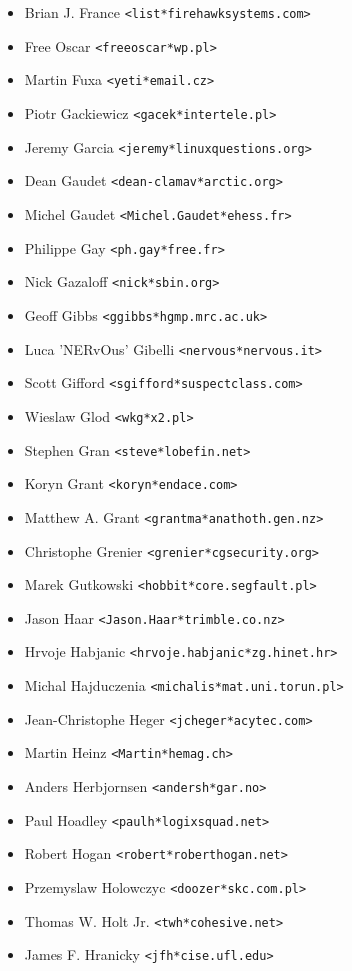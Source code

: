 \documentclass[a4paper,titlepage,12pt]{article}
\newcommand{\email}[1]{\texttt{#1}}
\begin{document}
\begin{itemize}
	\item Brian J. France \email{<list*firehawksystems.com>}
	\item Free Oscar \email{<freeoscar*wp.pl>}
	\item Martin Fuxa \email{<yeti*email.cz>}
	\item Piotr Gackiewicz \email{<gacek*intertele.pl>}
	\item Jeremy Garcia \email{<jeremy*linuxquestions.org>}
	\item Dean Gaudet \email{<dean-clamav*arctic.org>}
	\item Michel Gaudet \email{<Michel.Gaudet*ehess.fr>}
	\item Philippe Gay \email{<ph.gay*free.fr>}
	\item Nick Gazaloff \email{<nick*sbin.org>}
	\item Geoff Gibbs \email{<ggibbs*hgmp.mrc.ac.uk>}
	\item Luca 'NERvOus' Gibelli \email{<nervous*nervous.it>}
	\item Scott Gifford \email{<sgifford*suspectclass.com>}
	\item Wieslaw Glod \email{<wkg*x2.pl>}
	\item Stephen Gran \email{<steve*lobefin.net>}
	\item Koryn Grant \email{<koryn*endace.com>}
	\item Matthew A. Grant \email{<grantma*anathoth.gen.nz>}
	\item Christophe Grenier \email{<grenier*cgsecurity.org>}
	\item Marek Gutkowski \email{<hobbit*core.segfault.pl>}
	\item Jason Haar \email{<Jason.Haar*trimble.co.nz>}
	\item Hrvoje Habjanic \email{<hrvoje.habjanic*zg.hinet.hr>}
	\item Michal Hajduczenia \email{<michalis*mat.uni.torun.pl>}
	\item Jean-Christophe Heger \email{<jcheger*acytec.com>}
	\item Martin Heinz \email{<Martin*hemag.ch>}
	\item Anders Herbjornsen \email{<andersh*gar.no>}
	\item Paul Hoadley \email{<paulh*logixsquad.net>}
	\item Robert Hogan \email{<robert*roberthogan.net>}
	\item Przemyslaw Holowczyc \email{<doozer*skc.com.pl>}
	\item Thomas W. Holt Jr. \email{<twh*cohesive.net>}
	\item James F.  Hranicky \email{<jfh*cise.ufl.edu>}

\end{itemize}
\end{document}
